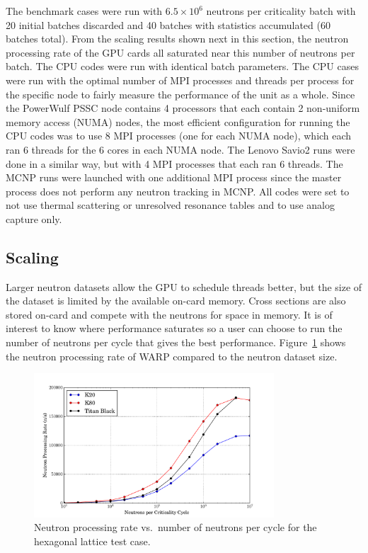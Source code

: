 \documentclass[preprint,12pt]{elsarticle}
\begin{document}
The benchmark cases were run with $6.5\times10^6$ neutrons per criticality batch with 20 initial batches discarded and 40 batches with statistics accumulated (60 batches total).  From the scaling results shown next in this section, the neutron processing rate of the GPU cards all saturated near this number of neutrons per batch.  The CPU codes were run with identical batch parameters.  The CPU cases were run with the optimal number of MPI processes and threads per process for the specific node to fairly measure the performance of the unit as a whole.  Since the PowerWulf PSSC node contains 4 processors that each contain 2 non-uniform memory access (NUMA) nodes, the most efficient configuration for running the CPU codes was to use 8 MPI processes (one for each NUMA node), which each ran 6 threads for the 6 cores in each NUMA node.  The Lenovo Savio2 runs were done in a similar way, but with 4 MPI processes that each ran 6 threads.  The MCNP runs were launched with one additional MPI process since the master process does not perform any neutron tracking in MCNP.  All codes were set to not use thermal scattering or unresolved resonance tables and to use analog capture only.

\subsection{Scaling}

Larger neutron datasets allow the GPU to schedule threads better, but the size of the dataset is limited by the available on-card memory.  Cross sections are also stored on-card and compete with the neutrons for space in memory.  It is of interest to know where performance saturates so a user can choose to run the number of neutrons per cycle that gives the best performance.  Figure~\ref{scaling} shows the neutron processing rate of WARP compared to the neutron dataset size.

\begin{figure}[!htbp]
\centering
\includegraphics[width=0.8\textwidth,trim= 1cm 0cm 1cm 0cm]{graphics/scaling.pdf}
\caption{Neutron processing rate vs.\ number of neutrons per cycle for the hexagonal lattice test case. \label{scaling} }
\end{figure}
\end{document}
